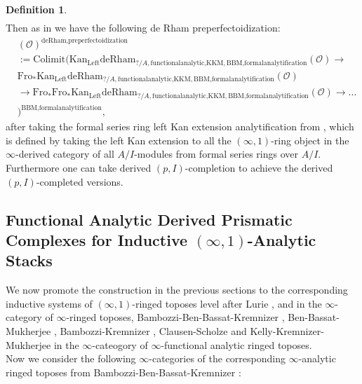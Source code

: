 \documentclass[11pt]{book}
\theoremstyle{definition}
\newtheorem{definition}[theorem]{Definition}
\numberwithin{equation}{section}
\begin{document}
\begin{definition}
\begin{align}
\end{align}	
Then as in \cite[Definition 8.2]{12BS} we have the following de Rham  preperfectoidization:
\begin{align}
&(\mathcal{O})^{\text{deRham,preperfectoidization}}\\
&:=\mathrm{Colimit}(\mathrm{Kan}_{\mathrm{Left}}\mathrm{deRham}_{?/A,\text{functionalanalytic,KKM},\text{BBM,formalanalytification}}(\mathcal{O})\rightarrow \\
&\mathrm{Fro}_*\mathrm{Kan}_{\mathrm{Left}}\mathrm{deRham}_{?/A,\text{functionalanalytic,KKM},\text{BBM,formalanalytification}}(\mathcal{O})\\
&\rightarrow \mathrm{Fro}_* \mathrm{Fro}_*\mathrm{Kan}_{\mathrm{Left}}\mathrm{deRham}_{?/A,\text{functionalanalytic,KKM},\text{BBM,formalanalytification}}(\mathcal{O})\rightarrow...\\
&)^{\text{BBM,formalanalytification}},	
\end{align}
after taking the formal series ring left Kan extension analytification from \cite[Section 4.2]{BBM}, which is defined by taking the left Kan extension to all the $(\infty,1)$-ring object in the $\infty$-derived category of all $A/I$-modules from formal series rings over $A/I$. 
Furthermore one can take derived $(p,I)$-completion to achieve the derived $(p,I)$-completed versions.


\end{definition}


\subsection{Functional Analytic Derived Prismatic Complexes for Inductive $(\infty,1)$-Analytic Stacks}

\indent We now promote the construction in the previous sections to the corresponding inductive systems of $(\infty,1)$-ringed toposes level after Lurie \cite{12Lu1}, \cite{12Lu2} and \cite{Lu3} in the $\infty$-category of $\infty$-ringed toposes, Bambozzi-Ben-Bassat-Kremnizer \cite{12BBBK}, Ben-Bassat-Mukherjee \cite{BBM}, Bambozzi-Kremnizer \cite{12BK}, Clausen-Scholze \cite{12CS1} \cite{12CS2} and Kelly-Kremnizer-Mukherjee \cite{KKM} in the $\infty$-cateogory of $\infty$-functional analytic ringed toposes.\\

\indent Now we consider the following $\infty$-categories of the corresponding $\infty$-analytic ringed toposes from Bambozzi-Ben-Bassat-Kremnizer \cite{12BBBK}:\\
\end{document}
